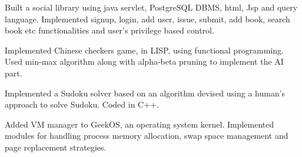 



\begin{cventries}

  \cvproject
    {
      \begin{cvitems} %
         \item{ Built a social library using java servlet, PostgreSQL DBMS, html, Jsp and query language. Implemented signup, login, add user, issue, submit, add book, search book etc  functionalities and  user’s privilege based control.}
\item{ Implemented Chinese checkers game, in LISP, using functional programming. Used min-max algorithm along with alpha-beta pruning to implement the AI part.}
\item{Implemented a Sudoku solver based on an algorithm devised using a human’s approach to solve Sudoku. Coded in C++.}
\item{ Added VM manager to GeekOS, an operating system kernel. Implemented modules for handling process memory allocation, swap space management and page replacement strategies. }
      \end{cvitems}
    }

\end{cventries}